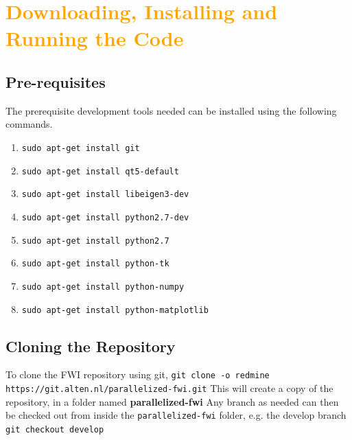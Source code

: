 \documentclass[10pt,a4paper]{article}
\begin{document}
\section{\textcolor{orange}{Downloading, Installing and Running the Code}}

\subsection{Pre-requisites}
The prerequisite development tools needed can be installed using the following commands.

\begin{enumerate}
    \item \texttt{sudo apt-get install git}  
    \item \texttt{sudo apt-get install qt5-default}
    \item \texttt{sudo apt-get install libeigen3-dev}
    \item \texttt{sudo apt-get install python2.7-dev}
    \item \texttt{sudo apt-get install python2.7}
    \item \texttt{sudo apt-get install python-tk}
    \item \texttt{sudo apt-get install python-numpy}
    \item \texttt{sudo apt-get install python-matplotlib}

\end{enumerate}

\subsection{Cloning the Repository}
\noindent To clone the FWI repository using git,
\newline
\texttt{git clone -o redmine https://git.alten.nl/parallelized-fwi.git}
\newline
This will create a copy of the repository, in a folder named \textbf{parallelized-fwi}
\newline
Any branch as needed can then be checked out from inside the \texttt{parallelized-fwi} folder, e.g. the develop branch
\newline
\texttt{git checkout develop}
\end{document}

